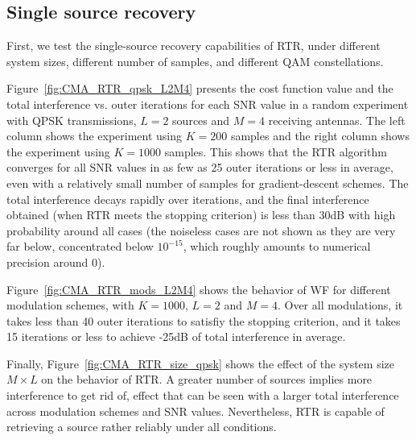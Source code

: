 \subsection{Single source recovery}\label{sim:RTR}
First, we test the single-source recovery capabilities of RTR, under different system sizes, different number of samples, and different QAM constellations. 

Figure~\ref{fig:CMA_RTR_qpsk_L2M4} presents the cost function value and the total interference vs. outer iterations for each SNR value in a random experiment with QPSK transmissions, $L=2$ sources and $M=4$ receiving antennas. The left column shows the experiment using $K=200$ samples and the right column shows the experiment using $K=1000$ samples. This shows that the RTR algorithm converges for all SNR values in as few as 25 outer iterations or less in average, even with a relatively small number of samples for gradient-descent schemes. The total interference decays rapidly over iterations, and the final interference obtained (when RTR meets the stopping criterion) is less than 30dB with high probability around all cases (the noiseless cases are not shown as they are very far below, concentrated below $10^{-15}$, which roughly amounts to numerical precision around 0).

Figure~\ref{fig:CMA_RTR_mods_L2M4} shows the behavior of WF for different modulation schemes, with $K=1000$, $L=2$ and $M=4$. Over all modulations, it takes less than 40 outer iterations to satisfiy the stopping criterion, and it takes 15 iterations or less to achieve -25dB of total interference in average.

Finally, Figure~\ref{fig:CMA_RTR_size_qpsk} shows the effect of the system size $M\times L$ on the behavior of RTR. A greater number of sources implies more interference to get rid of, effect that can be seen with a larger total interference across modulation schemes and SNR values. Nevertheless, RTR is capable of retrieving a source rather reliably under all conditions.
 
